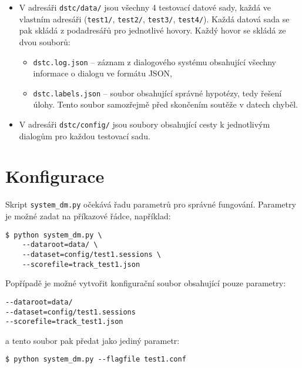 \begin{itemize}
\item V adresáři \texttt{dstc/data/} jsou všechny 4 testovací datové sady, každá ve vlastním adresáři (\texttt{test1/}, \texttt{test2/}, \texttt{test3/}, \texttt{test4/}).
Každá datová sada se pak skládá z podadresářů pro jednotlivé hovory.
Každý hovor se skládá ze dvou souborů:
	\begin{itemize}
	\item \texttt{dstc.log.json} -- záznam z dialogového systému obsahující všechny informace o dialogu ve formátu JSON,
	\item \texttt{dstc.labels.json} -- soubor obsahující správné hypotézy, tedy řešení úlohy. Tento soubor samozřejmě před skončením soutěže v datech  chyběl.
	\end{itemize}

\item V adresáři \texttt{dstc/config/} jsou soubory obsahující cesty k jednotlivým dialogům pro každou testovací sadu.
\end{itemize}

\section{Konfigurace}

Skript \texttt{system\_dm.py} očekává řadu parametrů pro správné fungování.
Parametry je možné zadat na příkazové řádce, například:
\begin{verbatim}
$ python system_dm.py \
    --dataroot=data/ \
    --dataset=config/test1.sessions \
    --scorefile=track_test1.json
\end{verbatim}

Popřípadě je možné vytvořit konfigurační soubor obsahující pouze parametry:
\begin{verbatim}
--dataroot=data/
--dataset=config/test1.sessions
--scorefile=track_test1.json
\end{verbatim}
a tento soubor pak předat jako jediný parametr:
\begin{verbatim}
$ python system_dm.py --flagfile test1.conf
\end{verbatim}

